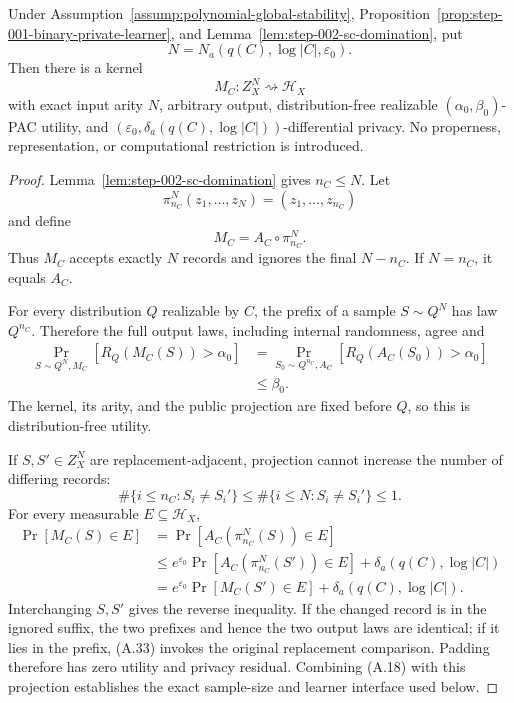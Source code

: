\begin{proposition}
\label{prop:step-002-exact-padding}
Under Assumption~\ref{assump:polynomial-global-stability},
Proposition~\ref{prop:step-001-binary-private-learner}, and
Lemma~\ref{lem:step-002-sc-domination}, put
\[
N=N_a(q(C),\log|C|,\varepsilon_0).
\]
Then there is a kernel
\[
M_C:Z_X^N\rightsquigarrow\mathcal H_X
\]
with exact input arity \(N\), arbitrary output, distribution-free
realizable \((\alpha_0,\beta_0)\)-PAC utility, and
\((\varepsilon_0,\delta_a(q(C),\log|C|))\)-differential privacy.
No properness, representation, or computational restriction is
introduced.
\end{proposition}

\begin{proof}
Lemma~\ref{lem:step-002-sc-domination} gives \(n_C\leq N\).  Let
\[
\pi_{n_C}^N(z_1,\ldots,z_N)=(z_1,\ldots,z_{n_C})
\tag{A.30}
\]
and define
\[
M_C=A_C\circ\pi_{n_C}^N.
\tag{A.31}
\]
Thus \(M_C\) accepts exactly \(N\) records and ignores the final
\(N-n_C\).  If \(N=n_C\), it equals \(A_C\).

For every distribution \(Q\) realizable by \(C\), the prefix of a
sample \(S\sim Q^N\) has law \(Q^{n_C}\).  Therefore the full output
laws, including internal randomness, agree and
\[
\begin{aligned}
\Pr_{S\sim Q^N,M_C}[R_Q(M_C(S))>\alpha_0]
&=
\Pr_{S_0\sim Q^{n_C},A_C}
[R_Q(A_C(S_0))>\alpha_0]\\
&\leq\beta_0.
\end{aligned}
\tag{A.32}
\]
The kernel, its arity, and the public projection are fixed before
\(Q\), so this is distribution-free utility.

If \(S,S'\in Z_X^N\) are replacement-adjacent, projection cannot
increase the number of differing records:
\[
\#\{i\leq n_C:S_i\neq S_i'\}
\leq
\#\{i\leq N:S_i\neq S_i'\}
\leq1.
\tag{A.33}
\]
For every measurable \(E\subseteq\mathcal H_X\),
\[
\begin{aligned}
\Pr[M_C(S)\in E]
&=\Pr[A_C(\pi_{n_C}^N(S))\in E]\\
&\leq e^{\varepsilon_0}
\Pr[A_C(\pi_{n_C}^N(S'))\in E]
+\delta_a(q(C),\log|C|)\\
&=e^{\varepsilon_0}\Pr[M_C(S')\in E]
+\delta_a(q(C),\log|C|).
\end{aligned}
\tag{A.34}
\]
Interchanging \(S,S'\) gives the reverse inequality.  If the changed
record is in the ignored suffix, the two prefixes and hence the two
output laws are identical; if it lies in the prefix, (A.33) invokes
the original replacement comparison.  Padding therefore has zero
utility and privacy residual.  Combining (A.18) with this projection
establishes the exact sample-size and learner interface used below.
\end{proof}

